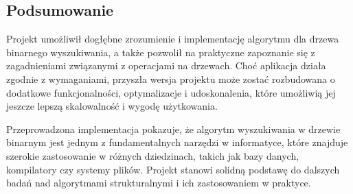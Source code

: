 \subsection{Podsumowanie}

Projekt umożliwił dogłębne zrozumienie i implementację algorytmu dla drzewa binarnego wyszukiwania, a także pozwolił na praktyczne zapoznanie się z zagadnieniami związanymi z operacjami na drzewach. Choć aplikacja działa zgodnie z wymaganiami, przyszła wersja projektu może zostać rozbudowana o dodatkowe funkcjonalności, optymalizacje i udoskonalenia, które umożliwią jej jeszcze lepszą skalowalność i wygodę użytkowania.

Przeprowadzona implementacja pokazuje, że algorytm wyszukiwania w drzewie binarnym jest jednym z fundamentalnych narzędzi w informatyce, które znajduje szerokie zastosowanie w różnych dziedzinach, takich jak bazy danych, kompilatory czy systemy plików. Projekt stanowi solidną podstawę do dalszych badań nad algorytmami strukturalnymi i ich zastosowaniem w praktyce.
